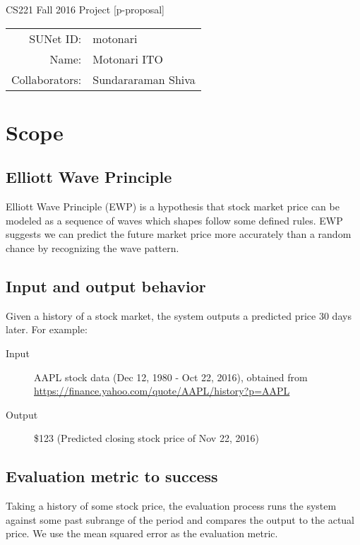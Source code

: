 \documentclass[12pt]{article}
\begin{document}
\begin{center}
{\Large CS221 Fall 2016 Project [p-proposal]}

\begin{tabular}{rl}
SUNet ID: & motonari \\
Name: & Motonari ITO \\
Collaborators: & Sundararaman Shiva
\end{tabular}
\end{center}

\section{Scope}

\subsection{Elliott Wave Principle}

Elliott Wave Principle (EWP) is a hypothesis that stock market price
can be modeled as a sequence of waves which shapes follow some defined
rules. EWP suggests we can predict the future market price more
accurately than a random chance by recognizing the wave pattern.

\subsection{Input and output behavior}

Given a history of a stock market, the system outputs a predicted
price 30 days later. For example:

\begin{description}
\item[Input] AAPL stock data (Dec 12, 1980 - Oct 22, 2016), obtained from \url{https://finance.yahoo.com/quote/AAPL/history?p=AAPL}
\item[Output] \$123 (Predicted closing stock price of Nov 22, 2016)
\end{description}

\subsection{Evaluation metric to success}

Taking a history of some stock price, the evaluation process runs the
system against some past subrange of the period and compares the
output to the actual price. We use the mean squared error as the
evaluation metric.
      
\end{document}
